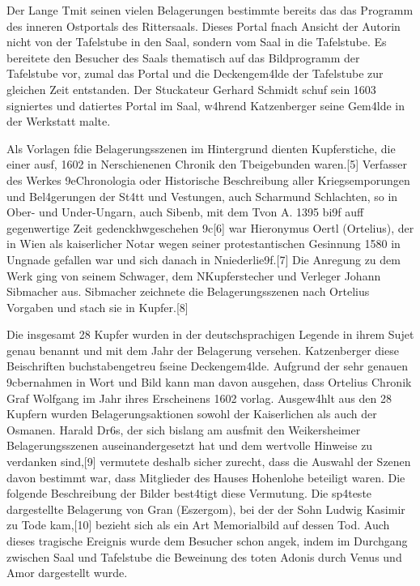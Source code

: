 \documentclass[
  a4paper,
  portrait]{book}
\begin{document}
Der Lange T\xbcrkenkrieg mit seinen vielen Belagerungen bestimmte
bereits das das Programm des inneren Ostportals des Rittersaals. Dieses
Portal f\xbchrte nach Ansicht der Autorin nicht von der Tafelstube
in den Saal, sondern vom Saal in die Tafelstube. Es bereitete den
Besucher des Saals thematisch auf das Bildprogramm der Tafelstube vor,
zumal das Portal und die Deckengem\xa4lde der Tafelstube zur
gleichen Zeit entstanden. Der Stuckateur Gerhard Schmidt schuf sein 1603
signiertes und datiertes Portal im Saal, w\xa4hrend Katzenberger
seine Gem\xa4lde in der Werkstatt malte.

Als Vorlagen f\xbcr die Belagerungsszenen im Hintergrund dienten
Kupferstiche, die einer ausf\xbchrlichen, 1602 in
N\xbcrnberg erschienenen Chronik \xbcber den
T\xbcrkenkrieg beigebunden waren.{[}5{]} Verfasser des Werkes
\x9eChronologia oder Historische Beschreibung aller
Kriegsemporungen und Bel\xa4gerungen der St\xa4tt und Vestungen,
auch Scharm\xbctzeln und Schlachten, so in Ober- und Under-Ungarn,
auch Sibenb\xbcrgen, mit dem T\xbcrcken von A. 1395 bi\x9f
auff gegenwertige Zeit gedenckhw\xbcrdig geschehen
\x9c{[}6{]} war Hieronymus Oertl (Ortelius), der in
Wien als kaiserlicher Notar wegen seiner protestantischen Gesinnung 1580
in Ungnade gefallen war und sich danach in
N\xbcrnberg niederlie\x9f.{[}7{]} Die Anregung zu dem Werk ging
von seinem Schwager, dem N\xbcrnberger Kupferstecher und Verleger
Johann Sibmacher aus. Sibmacher zeichnete die Belagerungsszenen nach
Ortelius Vorgaben und stach sie in Kupfer.{[}8{]}

Die insgesamt 28 Kupfer wurden in der deutschsprachigen Legende in ihrem
Sujet genau benannt und mit dem Jahr der Belagerung versehen.
Katzenberger \xbcbernahm diese Beischriften buchstabengetreu
f\xbcr seine Deckengem\xa4lde. Aufgrund der sehr genauen
\x9cbernahmen in Wort und Bild kann man davon ausgehen, dass
Ortelius Chronik Graf Wolfgang im Jahr ihres Erscheinens
1602 vorlag. Ausgew\xa4hlt aus den 28 Kupfern wurden
Belagerungsaktionen sowohl der Kaiserlichen als auch der Osmanen. Harald
Dr\xb6s, der sich bislang am ausf\xbchrlichsten mit den
Weikersheimer Belagerungsszenen auseinandergesetzt hat und dem wertvolle
Hinweise zu verdanken sind,{[}9{]} vermutete deshalb sicher zurecht,
dass die Auswahl der Szenen davon bestimmt war, dass Mitglieder des
Hauses Hohenlohe beteiligt waren. Die folgende Beschreibung der Bilder
best\xa4tigt diese Vermutung. Die sp\xa4teste dargestellte
Belagerung von Gran (Eszergom), bei der der Sohn Ludwig Kasimir zu Tode
kam,{[}10{]} bezieht sich als ein Art Memorialbild auf dessen Tod. Auch
dieses tragische Ereignis wurde dem Besucher schon angek\xbcndigt,
indem im Durchgang zwischen Saal und Tafelstube die Beweinung des toten
Adonis durch Venus und Amor dargestellt wurde.
\end{document}
